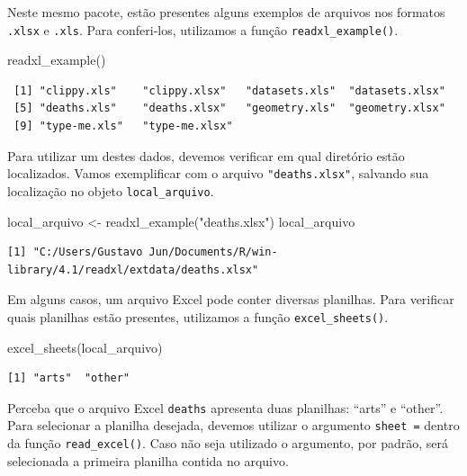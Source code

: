 \documentclass[
  brazilian,
]{book}
\newenvironment{Shaded}{\begin{snugshade}}{\end{snugshade}}
\newcommand{\FunctionTok}[1]{\textcolor[rgb]{0.00,0.00,0.00}{#1}}
\newcommand{\NormalTok}[1]{#1}
\newcommand{\OtherTok}[1]{\textcolor[rgb]{0.56,0.35,0.01}{#1}}
\newcommand{\StringTok}[1]{\textcolor[rgb]{0.31,0.60,0.02}{#1}}
\begin{document}
Neste mesmo pacote, estão presentes alguns exemplos de arquivos nos formatos \texttt{.xlsx} e \texttt{.xls}. Para conferi-los, utilizamos a função \texttt{readxl\_example()}.

\begin{Shaded}
\begin{Highlighting}[]
\FunctionTok{readxl\_example}\NormalTok{()}
\end{Highlighting}
\end{Shaded}

\begin{verbatim}
 [1] "clippy.xls"    "clippy.xlsx"   "datasets.xls"  "datasets.xlsx"
 [5] "deaths.xls"    "deaths.xlsx"   "geometry.xls"  "geometry.xlsx"
 [9] "type-me.xls"   "type-me.xlsx" 
\end{verbatim}

Para utilizar um destes dados, devemos verificar em qual diretório estão localizados. Vamos exemplificar com o arquivo \texttt{"deaths.xlsx"}, salvando sua localização no objeto \texttt{local\_arquivo}.

\begin{Shaded}
\begin{Highlighting}[]
\NormalTok{local\_arquivo }\OtherTok{\textless{}{-}} \FunctionTok{readxl\_example}\NormalTok{(}\StringTok{"deaths.xlsx"}\NormalTok{)}
\NormalTok{local\_arquivo}
\end{Highlighting}
\end{Shaded}

\begin{verbatim}
[1] "C:/Users/Gustavo Jun/Documents/R/win-library/4.1/readxl/extdata/deaths.xlsx"
\end{verbatim}

Em alguns casos, um arquivo Excel pode conter diversas planilhas. Para verificar quais planilhas estão presentes, utilizamos a função \texttt{excel\_sheets()}.

\begin{Shaded}
\begin{Highlighting}[]
\FunctionTok{excel\_sheets}\NormalTok{(local\_arquivo)}
\end{Highlighting}
\end{Shaded}

\begin{verbatim}
[1] "arts"  "other"
\end{verbatim}

Perceba que o arquivo Excel \texttt{deaths} apresenta duas planilhas: ``arts'' e ``other''. Para selecionar a planilha desejada, devemos utilizar o argumento \texttt{sheet\ =} dentro da função \texttt{read\_excel()}. Caso não seja utilizado o argumento, por padrão, será selecionada a primeira planilha contida no arquivo.
\end{document}

